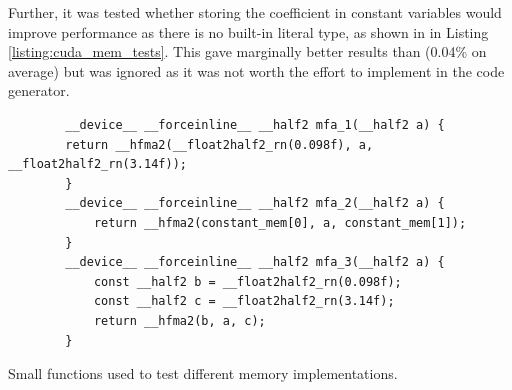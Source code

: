 Further, it was tested whether storing the coefficient in constant variables would improve performance as there is no built-in  literal type, as shown in  in Listing \ref{listing:cuda_mem_tests}.
This gave marginally better results than  (0.04\% on average) but was ignored as it was not worth the effort to implement in the code generator.

\begin{listing}[H]
    \begin{verbatim}
        __device__ __forceinline__ __half2 mfa_1(__half2 a) {
        return __hfma2(__float2half2_rn(0.098f), a, __float2half2_rn(3.14f));
        }
        __device__ __forceinline__ __half2 mfa_2(__half2 a) {
            return __hfma2(constant_mem[0], a, constant_mem[1]);
        }
        __device__ __forceinline__ __half2 mfa_3(__half2 a) {
            const __half2 b = __float2half2_rn(0.098f);
            const __half2 c = __float2half2_rn(3.14f);
            return __hfma2(b, a, c);
        }
    \end{verbatim}
    \caption{Small functions used to test different memory implementations.}
    \label{listing:cuda_mem_tests}
\end{listing}




